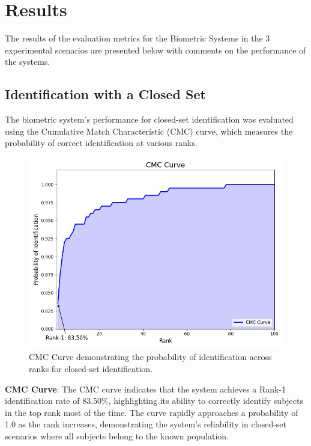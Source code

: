 \section{Results}
The results of the evaluation metrics for the Biometric Systems in the 3 experimental scenarios are presented below with comments on the performance of the systems.

\subsection{Identification with a Closed Set}

The biometric system's performance for closed-set identification was evaluated using the Cumulative Match Characteristic (CMC) curve, which measures the probability of correct identification at various ranks.

\begin{figure}[!ht]
    \centering
    \includegraphics[width=\columnwidth]{./images/plots/id-close/cmc_curve.png}
    \caption{CMC Curve demonstrating the probability of identification across ranks for closed-set identification.}
    \label{fig:cmc_curve}
\end{figure}

\textbf{CMC Curve}: The CMC curve indicates that the system achieves a Rank-1 identification rate of 83.50\%, highlighting its ability to correctly identify subjects in the top rank most of the time. The curve rapidly approaches a probability of 1.0 as the rank increases, demonstrating the system's reliability in closed-set scenarios where all subjects belong to the known population.

